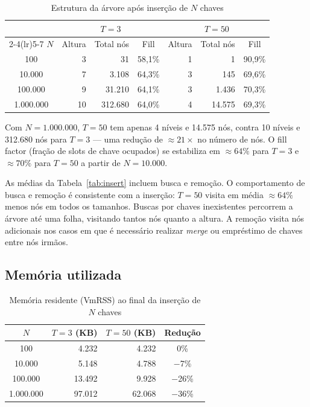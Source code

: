 \documentclass{ifpr-pinhais}
\begin{document}
\begin{table}[H]
\centering
\caption{Estrutura da árvore após inserção de $N$ chaves}
\label{tab:stats}
\begin{tabular}{c rrc rrc}
\toprule
 & \multicolumn{3}{c}{$T = 3$} & \multicolumn{3}{c}{$T = 50$} \\
\cmidrule(lr){2-4}\cmidrule(lr){5-7}
$N$ & Altura & Total nós & Fill & Altura & Total nós & Fill \\
\midrule
100        & 3  &      31 & 58,1\% & 1 &      1 & 90,9\% \\
10.000     & 7  &   3.108 & 64,3\% & 3 &    145 & 69,6\% \\
100.000    & 9  &  31.210 & 64,1\% & 3 &  1.436 & 70,3\% \\
1.000.000  & 10 & 312.680 & 64,0\% & 4 & 14.575 & 69,3\% \\
\bottomrule
\end{tabular}
\end{table}

Com $N = 1.000.000$, $T = 50$ tem apenas 4 níveis e 14.575 nós, contra 10 níveis e 312.680 nós para $T = 3$ --- uma redução de $\approx 21\times$ no número de nós. O fill factor (fração de slots de chave ocupados) se estabiliza em $\approx 64\%$ para $T = 3$ e $\approx 70\%$ para $T = 50$ a partir de $N = 10.000$.

As médias da Tabela~\ref{tab:insert} incluem busca e remoção. O comportamento de busca e remoção é consistente com a inserção: $T = 50$ visita em média $\approx 64\%$ menos nós em todos os tamanhos. Buscas por chaves inexistentes percorrem a árvore até uma folha, visitando tantos nós quanto a altura. A remoção visita nós adicionais nos casos em que é necessário realizar \textit{merge} ou empréstimo de chaves entre nós irmãos.

\subsection{Memória utilizada}

\begin{table}[H]
\centering
\caption{Memória residente (VmRSS) ao final da inserção de $N$ chaves}
\label{tab:mem}
\begin{tabular}{crrc}
\toprule
$N$ & $T = 3$ (KB) & $T = 50$ (KB) & Redução \\
\midrule
100        &  4.232 &  4.232 & 0\%  \\
10.000     &  5.148 &  4.788 & $-$7\%  \\
100.000    & 13.492 &  9.928 & $-$26\% \\
1.000.000  & 97.012 & 62.068 & $-$36\% \\
\bottomrule
\end{tabular}
\end{table}
\end{document}
